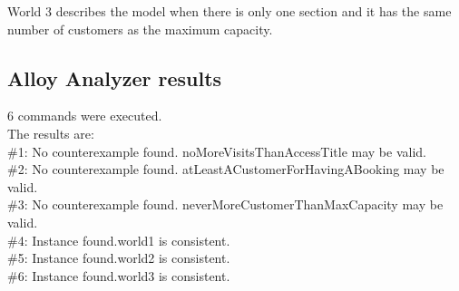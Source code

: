 World 3 describes the model when there is only one section and it has the same number of customers as the maximum capacity.

\subsection{Alloy Analyzer results}

6 commands were executed.\\
The results are:\\
\#1: No counterexample found. noMoreVisitsThanAccessTitle may be valid.\\
\#2: No counterexample found. atLeastACustomerForHavingABooking may be valid.\\
\#3: No counterexample found. neverMoreCustomerThanMaxCapacity may be valid.\\
\#4: Instance found.world1 is consistent.\\
\#5: Instance found.world2 is consistent.\\
\#6: Instance found.world3 is consistent.\\
